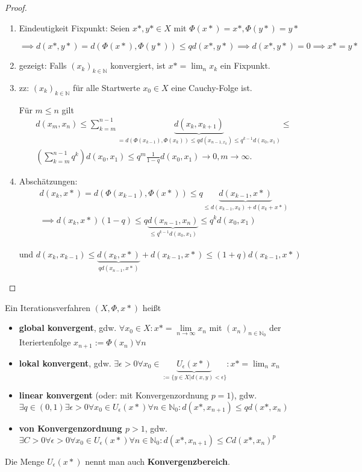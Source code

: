 \begin{proof}
	\begin{enumerate}
		\item Eindeutigkeit Fixpunkt: Seien $x*, y* \in X$ mit $\Phi(x*) = x*, \Phi(y*) = y*$
		
		$\implies d(x*, y*) = d(\Phi(x*), \Phi(y*)) \leq q d(x*, y*) \implies d(x*, y*) = 0 \implies x* = y*$
		
		\item gezeigt: Falls $(x_k)_{k \in \mathbb{N}}$ konvergiert, ist $x* = \lim_n x_k$ ein Fixpunkt.
		
		\item zz: $(x_k)_{k \in \mathbb{N}}$ für alle Startwerte $x_0 \in X$ eine Cauchy-Folge ist.
		
		Für $m \leq n$ gilt
		\begin{align*}
			d(x_m, x_n) \leq \sum_{k=m}^{n-1} \underbrace{d(x_k, x_{k+1})}_{= d(\Phi(x_{k-1}), \Phi(x_k)) \leq q d(x_{n-1, x_k}) \leq q^{k-1} d(x_0, x_1)} \leq\\ \left(\sum_{k=m}^{n-1} q^k\right) d(x_0, x_1) \leq
			q^m \frac{1}{1-q} d(x_0, x_1) \rightarrow 0, m \rightarrow \infty.
		\end{align*}
		
		\item Abschätzungen:
		\begin{align*}
			d(x_k, x*) = d(\Phi(x_{k-1}), \Phi(x*)) \leq q \underbrace{d(x_{k-1}, x*)}_{\leq d(x_{k-1}, x_k) + d(x_k + x*)}\\
			\implies d(x_k, x*) (1-q) \leq q \underbrace{d(x_{n-1}, x_n)}_{\leq q^{k-1} d(x_0, x_1)} \leq q^k d(x_0, x_1)
		\end{align*}
		
		und $d(x_k, x_{k-1}) \leq \underbrace{d(x_k, x*)}_{q d(x_{n-1}, x*)} + d(x_{k-1}, x*) \leq (1+q) d(x_{k-1}, x*)$
	\end{enumerate}
\end{proof}

\begin{definition}
	Ein Iterationsverfahren $(X, \Phi, x*)$ heißt
	\begin{itemize}
		\item \textbf{global konvergent}, gdw. $\forall x_0 \in X: x* = \lim\limits_{n\rightarrow\infty} x_n$ mit $(x_n)_{n\in\mathbb{N}_0}$ der Iteriertenfolge $x_{n+1} := \Phi(x_n) \forall n$
		\item \textbf{lokal konvergent}, gdw. $\exists \epsilon > 0 \forall x_0 \in \underbrace{U_\epsilon(x*)}_{:=\{y \in X| d(x,y) < \epsilon\}}: x* = \lim_n x_n$
		\item \textbf{linear konvergent} (oder: mit Konvergenzordnung $p=1$), gdw. $\exists q \in (0,1) \exists \epsilon > 0 \forall x_0 \in U_\epsilon(x*) \forall n \in \mathbb{N}_0: d(x*, x_{n+1}) \leq q d(x*, x_n)$
		\item \textbf{von Konvergenzordnung $p > 1$}, gdw. $\exists C>0 \forall \epsilon>0 \forall x_0 \in U_\epsilon(x*) \forall n \in \mathbb{N}_0: d(x*, x_{n+1}) \leq C d(x*, x_n)^p$
	\end{itemize}
	
	Die Menge $U_\epsilon(x*)$ nennt man auch \textbf{Konvergenzbereich}.
\end{definition}

